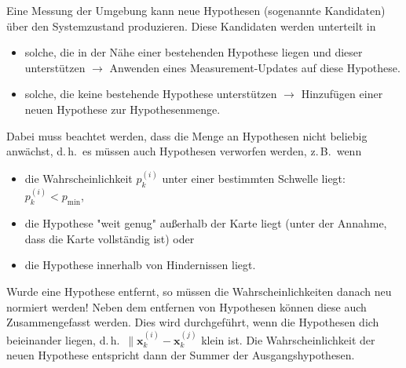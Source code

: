 \documentclass[a4paper, 11pt, accentcolor = tud3b]{tudreport}
\renewcommand{\vec}[1]{\boldsymbol{\mathbf{#1}}}
\renewcommand{\dh}{d.\,h.~}
\newcommand{\zB}{z.\,B.~}
\begin{document}
						Eine Messung der Umgebung kann neue Hypothesen (sogenannte Kandidaten) über den Systemzustand produzieren. Diese Kandidaten werden unterteilt in
						\begin{itemize}
							\item solche, die in der Nähe einer bestehenden Hypothese liegen und dieser unterstützen \( \to \) Anwenden eines Measurement-Updates auf diese Hypothese.
							\item solche, die keine bestehende Hypothese unterstützen \( \to \) Hinzufügen einer neuen Hypothese zur Hypothesenmenge.
						\end{itemize}
						Dabei muss beachtet werden, dass die Menge an Hypothesen nicht beliebig anwächst, \dh es müssen auch Hypothesen verworfen werden, \zB wenn
						\begin{itemize}
							\item die Wahrscheinlichkeit \( p_k^{(i)} \) unter einer bestimmten Schwelle liegt: \( p_k^{(i)} < p_\text{min} \),
							\item die Hypothese "weit genug" außerhalb der Karte liegt (unter der Annahme, dass die Karte vollständig ist) oder
							\item die Hypothese innerhalb von Hindernissen liegt.
						\end{itemize}
						Wurde eine Hypothese entfernt, so müssen die Wahrscheinlichkeiten danach neu normiert werden! Neben dem entfernen von Hypothesen können diese auch Zusammengefasst werden. Dies wird durchgeführt, wenn die Hypothesen dich beieinander liegen, \dh \( \big\lVert \vec{x}_k^{(i)} - \vec{x}_k^{(j)} \) klein ist. Die Wahrscheinlichkeit der neuen Hypothese entspricht dann der Summer der Ausgangshypothesen.
					
\end{document}
